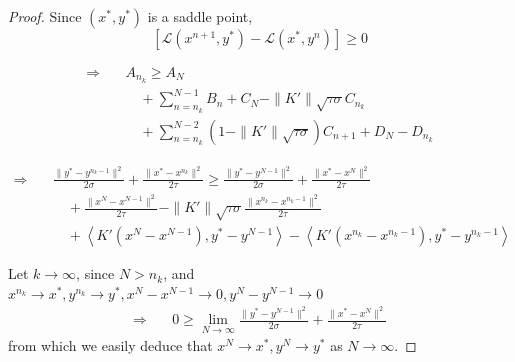 \documentclass[10pt,a4paper]{amsart}
\begin{document}
\begin{proof}
Since \((x^*,y^*)\) is a saddle point, 
\[\left[ \mathcal{L}(x^{n+1},y^*)- \mathcal{L}(x^*,y^n) \right] \ge 0\]

\[
\begin{aligned}
\Rightarrow\quad
&A_{n_k} \ge 
A_N \\
&\quad + \sum_{n=n_k}^{N-1} B_n + C_N - \|K'\|\sqrt{\tau\sigma}  C_{n_k} \\
&\quad + \sum_{n=n_k}^{N-2} (1 - \|K'\|\sqrt{\tau\sigma})  C_{n+1} + D_N - D_{n_k}
\end{aligned}
\]

\[
\begin{aligned}
\Rightarrow\quad
&\frac{\|y^*-y^{{n_k}-1}\|^2}{2\sigma} + \frac{\|x^*-x^{n_k}\|^2}{2\tau} \ge 
\frac{\|y^*-y^{N-1}\|^2}{2\sigma} + \frac{\|x^*-x^N\|^2}{2\tau} \\
&\quad + \frac{\|x^N- x^{N-1}\|^2}{2\tau} - \|K'\|\sqrt{\tau\sigma}  \frac{\|x^{n_k} - x^{{n_k}-1}\|^2}{2\tau} \\
&\quad +  \left\langle K'(x^N - x^{N-1}), y^* - y^{N-1} \right\rangle -  \left\langle K'(x^{n_k} - x^{{n_k}-1}), y^* - y^{{n_k}-1} \right\rangle
\end{aligned}
\]

Let \(k \to \infty\), since \(N>n_k\), and \(x^{n_k} \to x^*,y^{n_k} \to y^*, x^N-x^{N-1}\to0,y^N-y^{N-1}\to0\)
\[
\begin{aligned}
\Rightarrow\quad
&0 \ge 
\lim_{N \to \infty} \frac{\|y^*-y^{N-1}\|^2}{2\sigma} + \frac{\|x^*-x^N\|^2}{2\tau}
\end{aligned}
\]
from which we easily deduce that \(x^N \to x^*, y^N \to y^*\) as \(N\to \infty\).
\end{proof}
\end{document}
